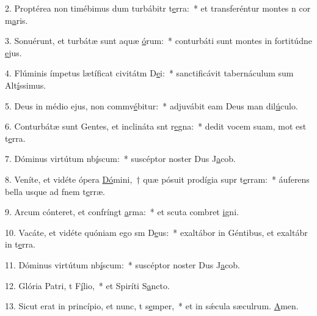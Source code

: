 2. Proptérea non timébimus dum turbábitr t\uline{e}rra:~* et transferéntur montes n cor m\uline{a}ris.\par 
3. Sonuérunt, et turbátæ sunt aquæ \uline{ó}rum:~* conturbáti sunt montes in fortitúdne \uline{e}jus.\par 
4. Flúminis ímpetus lætíficat civitátm D\uline{e}i:~* sanctificávit tabernáculum sum Alt\uline{í}ssimus.\par 
5. Deus in médio ejus, non commv\uline{é}bitur:~* adjuvábit eam Deus man dil\uline{ú}culo.\par 
6. Conturbátæ sunt Gentes, et inclináta snt r\uline{e}gna:~* dedit vocem suam, mot est t\uline{e}rra.\par 
7. Dóminus virtútum nb\uline{í}scum:~* suscéptor noster Dus J\uline{a}cob.\par 
8. Veníte, et vidéte ópera \uline{Dó}mini,~† quæ pósuit prodígia supr t\uline{e}rram:~* áuferens bella usque ad fnem t\uline{e}rræ.\par 
9. Arcum cónteret, et confríngt \uline{a}rma:~* et scuta combret \uline{i}gni.\par 
10. Vacáte, et vidéte quóniam ego sm D\uline{e}us:~* exaltábor in Géntibus, et exaltábr in t\uline{e}rra.\par 
11. Dóminus virtútum nb\uline{í}scum:~* suscéptor noster Dus J\uline{a}cob.\par 
12. Glória Patri, t F\uline{í}lio,~* et Spiríti S\uline{a}ncto.\par 
13. Sicut erat in princípio, et nunc, t s\uline{e}mper,~* et in sǽcula sæculrum. \uline{A}men.\par 
